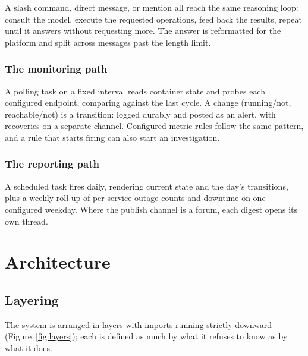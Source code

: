\documentclass[11pt,a4paper]{article}
\let\stdsection\section
\renewcommand{\section}{\clearpage\stdsection}
\begin{document}
A slash command, direct message, or mention all reach the same reasoning loop:
consult the model, execute the requested operations, feed back the results, repeat
until it answers without requesting more. The answer is reformatted for the
platform and split across messages past the length limit.

\subsubsection{The monitoring path}

A polling task on a fixed interval reads container state and probes each
configured endpoint, comparing against the last cycle. A change (running/not,
reachable/not) is a transition: logged durably and posted as an alert, with
recoveries on a separate channel. Configured metric rules follow the same pattern,
and a rule that starts firing can also start an investigation.

\subsubsection{The reporting path}

A scheduled task fires daily, rendering current state and the day's transitions,
plus a weekly roll-up of per-service outage counts and downtime on one configured
weekday. Where the publish channel is a forum, each digest opens its own thread.

\section{Architecture}

\subsection{Layering}

The system is arranged in layers with imports running strictly downward
(Figure~\ref{fig:layers}); each is defined as much by what it refuses to know as
by what it does.
\end{document}
